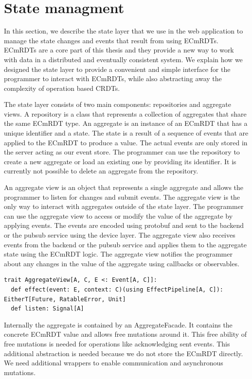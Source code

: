\documentclass[
	ngerman,
	ruledheaders=section,   %
	class=report,		    %
	thesis={type=bachelor}, %
	accentcolor=9c,			%
	custommargins=true,    %
	marginpar=false,        %
	parskip=half-,          %
	fontsize=11pt,          %
]{tudapub}
\begin{document}
\section{State managment}
In this section, we describe the state layer that we use in the web application to manage the state changes and events that result from using ECmRDTs. ECmRDTs are a core part of this thesis and they provide a new way to work with data in a distributed and eventually consistent system. We explain how we designed the state layer to provide a convenient and simple interface for the programmer to interact with ECmRDTs, while also abstracting away the complexity of operation based CRDTs.

The state layer consists of two main components: repositories and aggregate views. A repository is a class that represents a collection of aggregates that share the same ECmRDT type. An aggregate is an instance of an ECmRDT that has a unique identifier and a state. The state is a result of a sequence of events that are applied to the ECmRDT to produce a value. The actual events are only stored in the server acting as our event store. The programmer can use the repository to create a new aggregate or load an existing one by providing its identifier. It is currently not possible to delete an aggregate from the repository.

An aggregate view is an object that represents a single aggregate and allows the programmer to listen for changes and submit events. The aggregate view is the only way to interact with aggregates outside of the state layer. The programmer can use the aggregate view to access or modify the value of the aggregate by applying events. The events are encoded using protobuf and sent to the backend or the pubsub service using the device layer. The aggregate view also receives events from the backend or the pubsub service and applies them to the aggregate state using the ECmRDT logic. The aggregate view notifies the programmer about any changes in the value of the aggregate using callbacks or observables.

\begin{lstlisting}
trait AggregateView[A, C, E <: Event[A, C]]:
  def effect(event: E, context: C)(using EffectPipeline[A, C]): EitherT[Future, RatableError, Unit]
  def listen: Signal[A]
\end{lstlisting}

Internally the aggregate is contained by an AggregateFacade. It contains the concrete ECmRDT value and allows free mutations around it. This free ability of free mutations is needed for operations like acknowledging sent events. This additional abstraction is needed because we do not store the ECmRDT directly. We need additional wrappers to enable communication and asynchronous mutations. 
\end{document}
